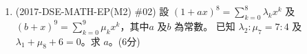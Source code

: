 \documentclass[12pt]{article}
\begin{document}
\begin{enumerate}
            \hrulefill
            
            \hrulefill
            
            \hrulefill
            
            \hrulefill
            
            \hrulefill
            
            \hrulefill
            
            \hrulefill
            
            \hrulefill
            
            \hrulefill
            
            \hrulefill
            
            \hrulefill

        \pagebreak
        \item (2017-DSE-MATH-EP(M2) \#02) 設 $\displaystyle (1+ax)^8=\sum_{k=0}^8 \lambda_k x^k$ 及 $\displaystyle(b+x)^9=\sum_{k=0}^9 \mu_k x^k$，其中$a$ 及$b$ 為常數。 已知 $\lambda_2:\mu_7=7:4$ 及 $\lambda_1+\mu_8+6=0$。求 $a$。\hfill(6分)
        
        \hrulefill
            
        \hrulefill
        
        \hrulefill
        
        \hrulefill
        
        \hrulefill
        
        \hrulefill
        
        \hrulefill
        
        \hrulefill
        
        \hrulefill
        
        \hrulefill
        
        \hrulefill
        
        \hrulefill
        
        \hrulefill
        
        \hrulefill
        
        \hrulefill
        
        \hrulefill
        
        \hrulefill
        
        \hrulefill
        
        \hrulefill
        
        \hrulefill
        
        \hrulefill
        

\end{enumerate}
\end{document}
